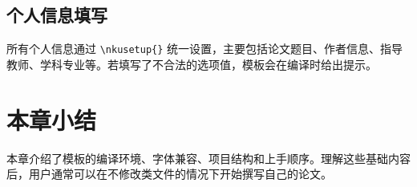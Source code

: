\subsection{个人信息填写}

所有个人信息通过 \texttt{\textbackslash nkusetup\{\}} 统一设置，主要包括论文题目、作者信息、指导教师、学科专业等。若填写了不合法的选项值，模板会在编译时给出提示。

\section{本章小结}

本章介绍了模板的编译环境、字体兼容、项目结构和上手顺序。理解这些基础内容后，用户通常可以在不修改类文件的情况下开始撰写自己的论文。
